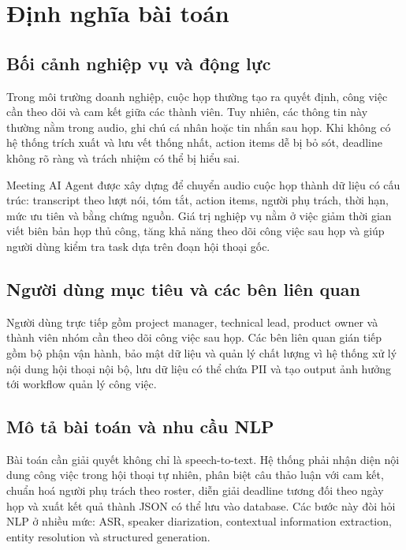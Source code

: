 \chapter{Định nghĩa bài toán}

\section{Bối cảnh nghiệp vụ và động lực}

Trong môi trường doanh nghiệp, cuộc họp thường tạo ra quyết định, công việc cần theo dõi và cam kết giữa các thành viên. Tuy nhiên, các thông tin này thường nằm trong audio, ghi chú cá nhân hoặc tin nhắn sau họp. Khi không có hệ thống trích xuất và lưu vết thống nhất, action items dễ bị bỏ sót, deadline không rõ ràng và trách nhiệm có thể bị hiểu sai.

Meeting AI Agent được xây dựng để chuyển audio cuộc họp thành dữ liệu có cấu trúc: transcript theo lượt nói, tóm tắt, action items, người phụ trách, thời hạn, mức ưu tiên và bằng chứng nguồn. Giá trị nghiệp vụ nằm ở việc giảm thời gian viết biên bản họp thủ công, tăng khả năng theo dõi công việc sau họp và giúp người dùng kiểm tra task dựa trên đoạn hội thoại gốc.

\section{Người dùng mục tiêu và các bên liên quan}

Người dùng trực tiếp gồm project manager, technical lead, product owner và thành viên nhóm cần theo dõi công việc sau họp. Các bên liên quan gián tiếp gồm bộ phận vận hành, bảo mật dữ liệu và quản lý chất lượng vì hệ thống xử lý nội dung hội thoại nội bộ, lưu dữ liệu có thể chứa PII và tạo output ảnh hưởng tới workflow quản lý công việc.

\section{Mô tả bài toán và nhu cầu NLP}

Bài toán cần giải quyết không chỉ là speech-to-text. Hệ thống phải nhận diện nội dung công việc trong hội thoại tự nhiên, phân biệt câu thảo luận với cam kết, chuẩn hoá người phụ trách theo roster, diễn giải deadline tương đối theo ngày họp và xuất kết quả thành JSON có thể lưu vào database. Các bước này đòi hỏi NLP ở nhiều mức: ASR, speaker diarization, contextual information extraction, entity resolution và structured generation.

